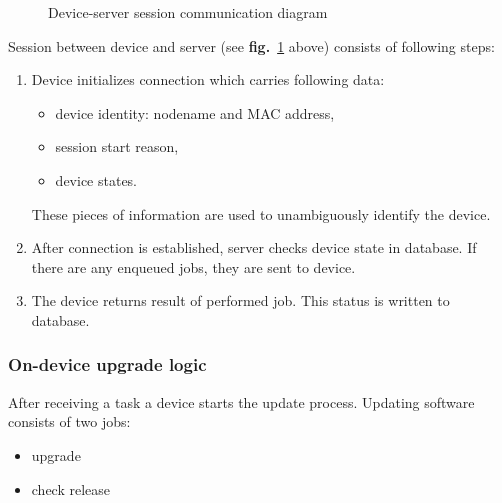 \begin{figure}[htbp]
  \centering
    \caption{Device-server session communication diagram}
    \label{fig:session}
\end{figure}

\noindent Session between device and server (see \textbf{fig.}~\ref{fig:session} above) consists of following steps:

\begin{enumerate}
  \item Device initializes connection which carries following data:
    \begin{itemize}
      \item device identity: nodename and MAC address,
      \item session start reason,
      \item device states.
  \end{itemize}
  These pieces of information are used to unambiguously identify the device.
  \item After connection is established, server checks device state in database.
  If there are any enqueued jobs, they are sent to device.
  \item The device returns result of performed job. This status is written to database.
\end{enumerate}

\subsubsection{On-device upgrade logic}
After receiving a task a device starts the update process. Updating software consists of two jobs:
\begin{itemize}
  \item upgrade
  \item check release
\end{itemize}

